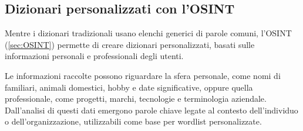 \subsection{Dizionari personalizzati con l'OSINT}\label{sec:IntegrazioneOSINT}
Mentre i dizionari tradizionali usano elenchi generici di parole comuni, l'OSINT (\cref{sec:OSINT}) permette di creare dizionari personalizzati, basati sulle informazioni personali e professionali degli utenti.

Le informazioni raccolte possono riguardare la sfera personale, come nomi di familiari, animali domestici, hobby e date significative, oppure quella professionale, come progetti, marchi, tecnologie e terminologia aziendale. Dall'analisi di questi dati emergono parole chiave legate al contesto dell'individuo o dell'organizzazione, utilizzabili come base per wordlist personalizzate.

